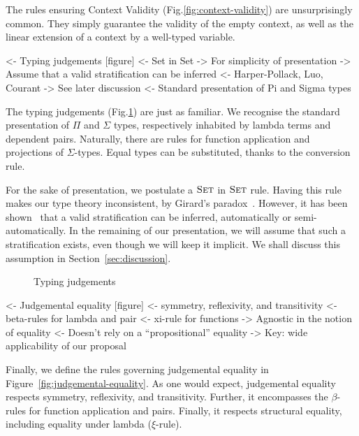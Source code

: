 The rules ensuring Context Validity (Fig.\ref{fig:context-validity})
are unsurprisingly common. They simply guarantee the validity of the
empty context, as well as the linear extension of a context by a
well-typed variable.

\begin{wstructure}
<- Typing judgements [figure]
    <- Set in Set
        -> For simplicity of presentation
        -> Assume that a valid stratification can be inferred
            <- Harper-Pollack, Luo, Courant
        -> See later discussion
    <- Standard presentation of Pi and Sigma types
\end{wstructure}

The typing judgements (Fig.\ref{fig:typing-judgements}) are just as
familiar. We recognise the standard presentation of $\Pi$ and $\Sigma$
types, respectively inhabited by lambda terms and dependent
pairs. Naturally, there are rules for function application and
projections of $\Sigma$-types. Equal types can be substituted, thanks
to the conversion rule.

For the sake of presentation, we postulate a $\Set$ in $\Set$
rule. Having this rule makes our type theory inconsistent, by Girard's
paradox~\cite{girard:set-in-set}. However, it has been
shown~\cite{harper:implicit-universe, luo:utt,
  courant:explicit-universe} that a valid stratification can be
inferred, automatically or semi-automatically. In the remaining of our
presentation, we will assume that such a stratification exists, even
though we will keep it implicit. We shall discuss this assumption in
Section~\ref{sec:discussion}.

\begin{figure}



\caption{Typing judgements}
\label{fig:typing-judgements}

\end{figure}


\begin{wstructure}
<- Judgemental equality [figure]
    <- symmetry, reflexivity, and transitivity
    <- beta-rules for lambda and pair
    <- xi-rule for functions
    -> Agnostic in the notion of equality
        <- Doesn't rely on a ``propositional'' equality
        -> Key: wide applicability of our proposal
\end{wstructure}

Finally, we define the rules governing judgemental equality in
Figure~\ref{fig:judgemental-equality}. As one would expect,
judgemental equality respects symmetry, reflexivity, and
transitivity. Further, it encompasses the $\beta$-rules for function
application and pairs. Finally, it respects structural equality,
including equality under lambda ($\xi$-rule).

